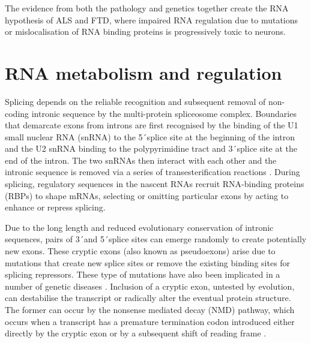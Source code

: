 The evidence from both the pathology and genetics together create the RNA hypothesis of ALS and FTD, where impaired RNA regulation due to mutations or mislocalisation of RNA binding proteins is progressively toxic to neurons.

\section{RNA metabolism and regulation}

Splicing depends on the reliable recognition and subsequent removal of non-coding intronic sequence by the multi-protein spliceosome complex. Boundaries that demarcate exons from introns are first recognised by the binding of the U1 small nuclear RNA (snRNA) to the 5\'\ splice site at the beginning of the intron and the U2 snRNA binding to the polypyrimidine tract and 3\'\ splice site at the end of the intron. The two snRNAs then interact with each other and the intronic sequence is removed via a series of transesterification reactions  \citep{Matera2014-pu}.  During splicing, regulatory sequences in the nascent RNAs recruit RNA-binding proteins (RBPs) to shape mRNAs, selecting or omitting particular exons by acting to enhance or repress splicing.

Due to the long length and reduced evolutionary conservation of intronic sequences, pairs of 3\'\ and 5\'\ splice sites can emerge randomly to create potentially new exons. These cryptic exons (also known as pseudoexons) arise due to mutations that create new splice sites or remove the existing binding sites for splicing repressors. These type of mutations have also been implicated in a number of genetic diseases \citep{Eng2004-lq, Buratti2007-iz, Vorechovsky2006-wb,Meili2009-hc}. Inclusion of a cryptic exon, untested by evolution, can destabilise the transcript or radically alter the eventual protein structure. The former can occur by the nonsense mediated decay (NMD) pathway, which occurs when a transcript has a premature termination codon introduced either directly by the cryptic exon or by a subsequent shift of reading frame \citep{McGlincy2008-wh}. 

